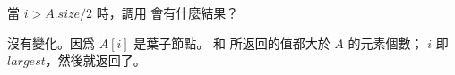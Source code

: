 \startEXERCISE
當 $i > A.size / 2$ 時，調用  會有什麼結果？
\stopEXERCISE

\startANSWER
沒有變化。因爲 $A[i]$ 是葉子節點。  和  所返回的值都大於 $A$ 的元素個數；
 $i$ 即 $largest$，然後就返回了。
\stopANSWER
